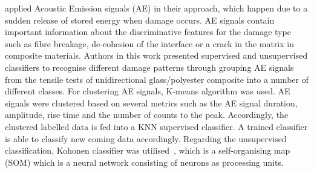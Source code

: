 \textcite{Godin2004} applied Acoustic Emission signals (AE) in their approach, which happen due to a sudden release of stored energy when damage occurs.
AE signals contain important information about the discriminative features 
for the damage type such as fibre breakage, de-cohesion of the interface or a crack in the matrix in composite materials.
Authors in this work presented supervised and unsupervised classifiers to recognise different damage patterns through grouping AE signals from the tensile tests of unidirectional glass/polyester composite into a number of different classes. 
For clustering AE signals, K-means algorithm was used. AE signals were clustered based on several metrics such as the AE signal duration, amplitude, rise time and the number of counts to the peak.
Accordingly, the clustered labelled data is fed into a KNN supervised classifier.
A trained classifier is able to classify new coming data accordingly.
Regarding the unsupervised classification, Kohonen classifier was utilised~\cite{58325}, which is a self-organising map (SOM) which is a neural network consisting of neurons as processing units. 

